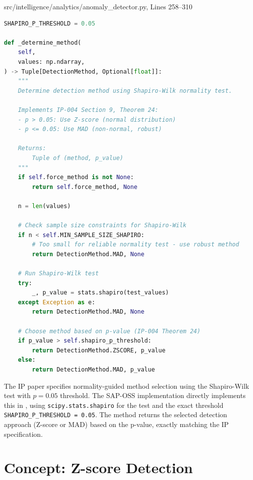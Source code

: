 \begin{implbox}{src/intelligence/analytics/anomaly\_detector.py, Lines 258--310}
\begin{lstlisting}[language=Python]
SHAPIRO_P_THRESHOLD = 0.05

def _determine_method(
    self,
    values: np.ndarray,
) -> Tuple[DetectionMethod, Optional[float]]:
    """
    Determine detection method using Shapiro-Wilk normality test.
    
    Implements IP-004 Section 9, Theorem 24:
    - p > 0.05: Use Z-score (normal distribution)
    - p <= 0.05: Use MAD (non-normal, robust)
    
    Returns:
        Tuple of (method, p_value)
    """
    if self.force_method is not None:
        return self.force_method, None
    
    n = len(values)
    
    # Check sample size constraints for Shapiro-Wilk
    if n < self.MIN_SAMPLE_SIZE_SHAPIRO:
        # Too small for reliable normality test - use robust method
        return DetectionMethod.MAD, None
    
    # Run Shapiro-Wilk test
    try:
        _, p_value = stats.shapiro(test_values)
    except Exception as e:
        return DetectionMethod.MAD, None
    
    # Choose method based on p-value (IP-004 Theorem 24)
    if p_value > self.shapiro_p_threshold:
        return DetectionMethod.ZSCORE, p_value
    else:
        return DetectionMethod.MAD, p_value
\end{lstlisting}
\end{implbox}

\begin{adaptbox}
The IP paper specifies normality-guided method selection using the Shapiro-Wilk test with $p = 0.05$ threshold. The SAP-OSS implementation directly implements this in , using \texttt{scipy.stats.shapiro} for the test and the exact threshold \texttt{SHAPIRO\_P\_THRESHOLD = 0.05}. The method returns the selected detection approach (Z-score or MAD) based on the p-value, exactly matching the IP specification.
\end{adaptbox}

\section{Concept: Z-score Detection}
\label{sec:ip004-zscore}

